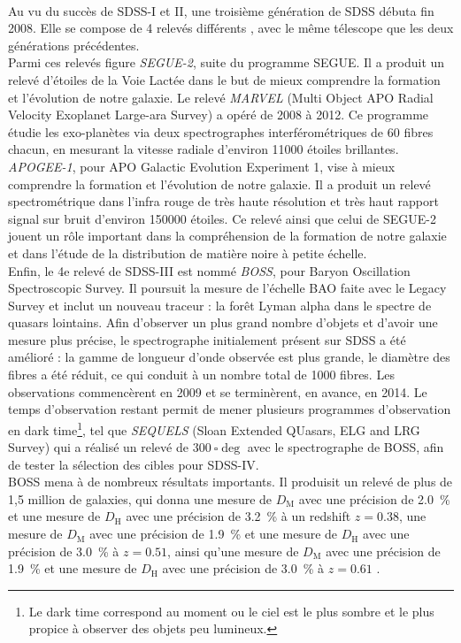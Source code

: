 \paragraph{}
Au vu du succès de SDSS-I et II, une troisième génération de SDSS débuta fin 2008. Elle se compose de 4 relevés différents \autocite{Eisenstein2011}, avec le même télescope que les deux générations précédentes. \\
Parmi ces relevés figure \emph{SEGUE-2}, suite du programme SEGUE. Il a produit un relevé d'étoiles de la Voie Lactée dans le but de mieux comprendre la formation et l'évolution de notre galaxie. Le relevé \emph{MARVEL} (Multi Object APO Radial Velocity Exoplanet Large-ara Survey) a opéré de 2008 à 2012. Ce programme étudie les exo-planètes via deux spectrographes interférométriques de 60 fibres chacun, en mesurant la vitesse radiale d'environ \num{11000} étoiles brillantes. \emph{APOGEE-1}, pour APO Galactic Evolution Experiment 1, vise à mieux comprendre la formation et l'évolution de notre galaxie. Il a produit un relevé spectrométrique dans l'infra rouge de très haute résolution et très haut rapport signal sur bruit d'environ \num{150000} étoiles. Ce relevé ainsi que celui de SEGUE-2 jouent un rôle important dans la compréhension de la formation de notre galaxie et dans l'étude de la distribution de matière noire à petite échelle.\\
Enfin, le 4e relevé de SDSS-III est nommé \emph{BOSS}, pour Baryon Oscillation Spectroscopic Survey. Il poursuit la mesure de l'échelle BAO faite avec le Legacy Survey et inclut un nouveau traceur : la forêt Lyman alpha dans le spectre de quasars lointains. Afin d'observer un plus grand nombre d'objets et d'avoir une mesure plus précise, le spectrographe initialement présent sur SDSS a été amélioré : la gamme de longueur d'onde observée est plus grande, le diamètre des fibres a été réduit, ce qui conduit à un nombre total de \num{1000} fibres. Les observations commencèrent en 2009 et se terminèrent, en avance, en 2014. Le temps d'observation restant permit de mener plusieurs programmes d'observation en dark time\footnote{Le dark time correspond au moment ou le ciel est le plus sombre et le plus propice à observer des objets peu lumineux.}, tel que \emph{SEQUELS} (Sloan Extended QUasars, ELG and LRG Survey) qui a réalisé un relevé de $\SI{300}{\square\deg}$ avec le spectrographe de BOSS, afin de tester la sélection des cibles pour SDSS-IV.\\
BOSS mena à de nombreux résultats importants.
Il produisit un relevé de plus de 1,5 million de galaxies, qui donna une mesure de $D_{\mathrm{M}}$ avec une précision de \SI{2.0}{\percent} et une mesure de $D_{\mathrm{H}}$ avec une précision de \SI{3.2}{\percent} à un redshift $z=\num{0,38}$, une mesure de $D_{\mathrm{M}}$ avec une précision de \SI{1.9}{\percent} et une mesure de $D_{\mathrm{H}}$ avec une précision de \SI{3.0}{\percent} à $z=\num{0,51}$, ainsi qu'une mesure de $D_{\mathrm{M}}$ avec une précision de \SI{1.9}{\percent} et une mesure de $D_{\mathrm{H}}$ avec une précision de \SI{3.0}{\percent} à $z=\num{0,61}$ \autocite{Alam2016}.
